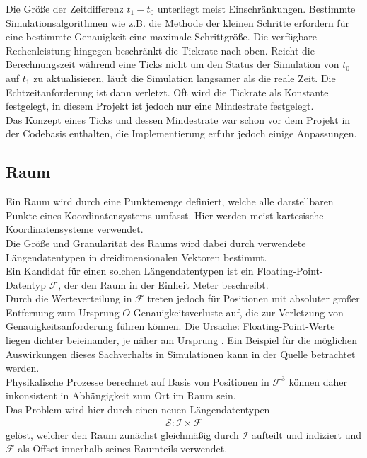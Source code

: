 Die Größe der Zeitdifferenz $t_1 - t_0$ unterliegt meist Einschränkungen. Bestimmte Simulationsalgorithmen wie z.B. die Methode der kleinen Schritte erfordern für eine bestimmte Genauigkeit eine maximale Schrittgröße. Die verfügbare Rechenleistung hingegen beschränkt die Tickrate nach oben. Reicht die Berechnungszeit während eine Ticks nicht um den Status der Simulation von $t_0$ auf $t_1$ zu aktualisieren, läuft die Simulation langsamer als die reale Zeit. Die Echtzeitanforderung ist dann verletzt. Oft wird die Tickrate als Konstante festgelegt, in diesem Projekt ist jedoch nur eine Mindestrate festgelegt.\\
Das Konzept eines Ticks und dessen Mindestrate war schon vor dem Projekt in der Codebasis enthalten, die Implementierung erfuhr jedoch einige Anpassungen.

\subsection{Raum}
\label{sec:space}
Ein Raum wird durch eine Punktemenge definiert, welche alle darstellbaren Punkte eines Koordinatensystems umfasst. Hier werden meist kartesische Koordinatensysteme verwendet.\\
Die Größe und Granularität des Raums wird dabei durch verwendete Längendatentypen in dreidimensionalen Vektoren bestimmt.\\
Ein Kandidat für einen solchen Längendatentypen ist ein Floating-Point-Datentyp  $\mathcal{F}$, der den Raum in der Einheit Meter beschreibt.\\
Durch die Werteverteilung in $\mathcal{F}$ treten jedoch für Positionen mit absoluter großer Entfernung zum Ursprung $O$ Genauigkeitsverluste auf, die zur Verletzung von Genauigkeitsanforderung führen können. 
Die Ursache: Floating-Point-Werte liegen dichter beieinander, je näher am Ursprung \cite{floatdistribution}. Ein Beispiel für die möglichen Auswirkungen dieses Sachverhalts in Simulationen kann in der Quelle \cite{floatdistributionexample} betrachtet werden.\\
Physikalische Prozesse berechnet auf Basis von Positionen in $\mathcal{F}^3$ können daher inkonsistent in Abhängigkeit zum Ort im Raum sein.\\
Das Problem wird hier durch einen neuen Längendatentypen 
\begin{align}
	\mathcal{S} : \mathcal{I} \times \mathcal{F}
\end{align} gelöst, welcher den Raum zunächst gleichmäßig durch $\mathcal{I}$ aufteilt und indiziert und $\mathcal{F}$ als Offset innerhalb seines Raumteils verwendet. 

